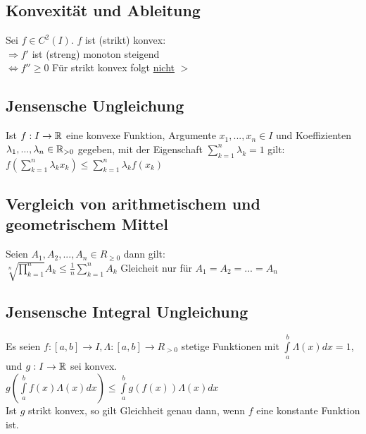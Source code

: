 \documentclass[german]{latex4ei/latex4ei_sheet}
\begin{document}
\begin{sectionbox}
	\subsection{Konvexität und Ableitung}
	Sei $f \in C^2(I)$. $f$ ist (strikt) konvex:\\
	$\Rightarrow f'$ ist (streng) monoton steigend\\
	$\Leftrightarrow f'' \ge 0$ Für strikt konvex folgt \underline{nicht} $>$

\end{sectionbox}

\begin{sectionbox}
	\subsection{Jensensche Ungleichung}
	Ist $f: I \rightarrow \operatorname{\mathbb R}$ eine konvexe Funktion, Argumente $x_1,...,x_n \in I$ und Koeffizienten $\lambda_1,...,\lambda_n \in  \operatorname{\mathbb R}_{>0}$ gegeben, mit der Eigenschaft  $\sum \limits_{k=1}^{n} \lambda_k = 1$ gilt:\\
	$f(\sum \limits_{k=1}^{n} \lambda_k x_k)\le \sum \limits_{k=1}^{n} \lambda_k f(x_k) $

\end{sectionbox}



\begin{sectionbox}
	\subsection{Vergleich von arithmetischem und geometrischem Mittel}
	Seien $A_1, A_2, . . . , A_n \in R_{ \ge 0}$ dann gilt:\\
	$\sqrt[n]{\prod \limits_{k=1}^{n}} A_k \le \frac{1}{n} \sum \limits_{k=1}^{n} A_k$ Gleicheit nur für $A_1=A_2=...=A_n$

\end{sectionbox}

\begin{sectionbox}
	\subsection{Jensensche Integral Ungleichung}
	
	Es seien $f : [a, b] \rightarrow I , \Lambda : [a, b] \rightarrow R_{>0}$ stetige Funktionen mit  $ \int \limits_{a}^{b} \Lambda(x) dx = 1$, und $g : I \rightarrow \operatorname{\mathbb R}$ sei konvex.\\
	$g(\int \limits_{a}^{b}f(x)\Lambda (x)dx) \le \int \limits_{a}^{b}g(f(x))\Lambda (x)dx$\\
	Ist $g$ strikt konvex, so gilt Gleichheit genau dann, wenn $f$ eine konstante Funktion ist.
\end{sectionbox}
\end{document}
